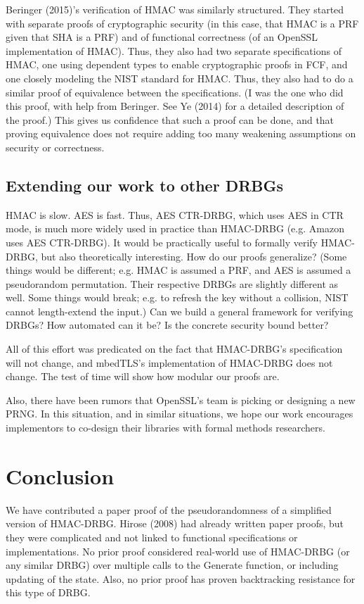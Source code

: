 \documentclass[12pt,lot, lof]{puthesis}
\begin{document}
{Beringer (2015)'s verification of HMAC was similarly structured. They started with separate proofs of cryptographic security (in this case, that HMAC is a PRF given that SHA is a PRF) and of functional correctness (of an OpenSSL implementation of HMAC). Thus, they also had two separate specifications of HMAC, one using dependent types to enable cryptographic proofs in FCF, and one closely modeling the NIST standard for HMAC. Thus, they also had to do a similar proof of equivalence between the specifications. (I was the one who did this proof, with help from Beringer. See Ye (2014) for a detailed description of the proof.) This gives us confidence that such a proof can be done, and that proving equivalence does not require adding too many weakening assumptions on security or correctness. 

\section{Extending our work to other DRBGs}

HMAC is slow. AES is fast. Thus, AES CTR-DRBG, which uses AES in CTR mode, is much more widely used in practice than HMAC-DRBG (e.g. Amazon uses AES CTR-DRBG). It would be practically useful to formally verify HMAC-DRBG, but also theoretically interesting. How do our proofs generalize? (Some things would be different; e.g. HMAC is assumed a PRF, and AES is assumed a pseudorandom permutation. Their respective DRBGs are slightly different as well. Some things would break; e.g. to refresh the key without a collision, NIST cannot length-extend the input.) Can we build a general framework for verifying DRBGs? How automated can it be? Is the concrete security bound better?

All of this effort was predicated on the fact that HMAC-DRBG's specification will not change, and mbedTLS's implementation of HMAC-DRBG does not change. The test of time will show how modular our proofs are.

Also, there have been rumors that OpenSSL's team is picking or designing a new PRNG. In this situation, and in similar situations, we hope our work encourages implementors to co-design their libraries with formal methods researchers.

\chapter{Conclusion}

We have contributed a paper proof of the pseudorandomness of a simplified version of HMAC-DRBG. Hirose (2008) had already written paper proofs, but they were complicated and not linked to functional specifications or implementations. No prior proof considered real-world use of HMAC-DRBG (or any similar DRBG) over multiple calls to the Generate function, or including updating of the state. Also, no prior proof has proven backtracking resistance for this type of DRBG.

}
\end{document}
